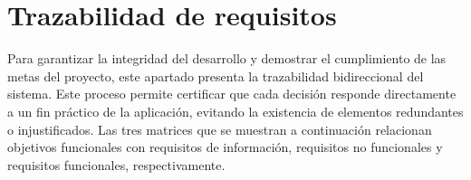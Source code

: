 \section{Trazabilidad de requisitos}\label{sec:trazabilidad_de_requisitos}
Para garantizar la integridad del desarrollo y demostrar el cumplimiento de las metas del proyecto, este apartado presenta la trazabilidad bidireccional del sistema. Este proceso permite certificar que cada decisión responde directamente a un fin práctico de la aplicación, evitando la existencia de elementos redundantes o injustificados. Las tres matrices que se muestran a continuación relacionan objetivos funcionales con requisitos de información, requisitos no funcionales y requisitos funcionales, respectivamente.

\begin{table}[H]
\centering
\small
\renewcommand{\arraystretch}{1.3}
\setlength{\tabcolsep}{2.5pt}
\caption{Matriz de trazabilidad RI-OBJ.}
\label{tab:matriz_trazabilidad_ri_obj}
\end{table}

